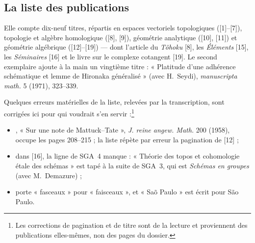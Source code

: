 \documentclass[11pt,a4paper]{article}
\begin{document}
\subsection*{La liste des publications}

Elle compte dix-neuf titres, répartis en espaces vectoriels topologiques
([1]--[7]), topologie et algèbre homologique ([8], [9]), géométrie analytique
([10], [11]) et géométrie algébrique ([12]--[19]) — dont l'article du
\emph{Tôhoku} [8], les \emph{Éléments} [15], les \emph{Séminaires} [16] et
le livre sur le complexe cotangent [19]. Le second exemplaire ajoute à la
main un vingtième titre : « Platitude d'une adhérence schématique et lemme de
Hironaka généralisé » (avec H.~Seydi), \emph{manuscripta math.} 5 (1971),
323--339.

Quelques erreurs matérielles de la liste, relevées par la transcription, sont
corrigées ici pour qui voudrait s'en servir :\footnote{Les corrections de
pagination et de titre sont de la lecture et proviennent des publications
elles-mêmes, non des pages du dossier.}
\begin{itemize}
\item [13], « Sur une note de Mattuck--Tate », \emph{J. reine angew. Math.}
  200 (1958), occupe les pages 208--215 ; la liste répète par erreur la
  pagination de [12] ;
\item dans [16], la ligne de SGA~4 manque : « Théorie des topos et
  cohomologie étale des schémas » est tapé à la suite de SGA~3, qui est
  \emph{Schémas en groupes} (avec M.~Demazure) ;
\item [9] porte « fasceaux » pour « faisceaux », et « Saõ Paulo » est écrit
  pour São Paulo.
\end{itemize}
\end{document}
